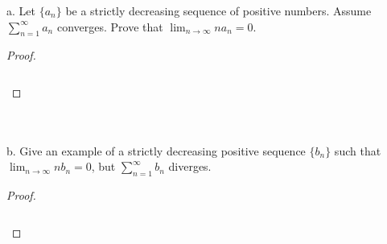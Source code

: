 a.  Let $\{a_n\}$ be a strictly decreasing sequence of positive numbers. Assume
    $\sum\limits_{n=1}^{\infty}{a_n}$ converges. Prove that
    $\lim_{n \rightarrow \infty}{na_n} = 0$.

    \begin{proof}\ \\\\
    
        \begin{align*}
        \end{align*}
    \end{proof}
    \ \\\\

b.  Give an example of a strictly decreasing positive sequence $\{b_n\}$ such
    that $\lim_{n \rightarrow \infty}{nb_n} = 0$, but
    $\sum\limits_{n=1}^{\infty}{b_n}$ diverges.

    \begin{proof}\ \\\\
        \begin{align*}
        \end{align*}

    \end{proof}